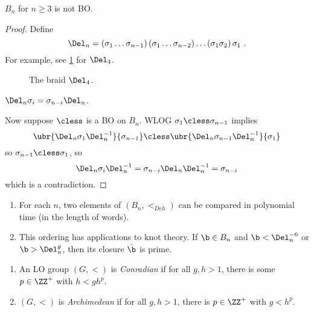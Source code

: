 \begin{prop}
$B_n$ for $n\geq 3$ is not BO.
\end{prop}

\begin{proof}
Define 
\begin{equation*}
\Del_n = \left(\sigma_1 \ldots \sigma_{n-1}\right) \left(\sigma_1 \ldots
\sigma_{n-2}\right) \ldots \left(\sigma_1 \sigma_2\right)\sigma_1
\ .
\end{equation*}
For example, see 
\cref{fig:del} for $\Del_4$.
\begin{figure}
\begin{overlay}
\end{overlay}
\caption{The braid $\Del_4$.}
\label{fig:del}
\end{figure}
\begin{clm}
$\Del_n \sigma_i = \sigma_{n-i} \Del_n$.
\end{clm}
Now suppose $\cless$ is a BO on $B_n$. WLOG $\sigma_1 \cless \sigma_{n-1}$ implies
\begin{equation*}
\ubr{\Del_n \sigma_1 \Del_n^{-1}}{\sigma_{n-1}} \cless \ubr{\Del_n \sigma_{n-1}
\Del_n^{-1}}{\sigma_1}
\end{equation*}
so $\sigma_{n-1} \cless \sigma_1$, so
\begin{equation*}
\Del_n \sigma_i \Del_n^{-1} = \sigma_{n-i} \Del_n \Del_n^{-1} = \sigma_{n-i}
\end{equation*}
which is a contradiction.
\end{proof}

\begin{rmk}
\begin{enumerate}
\item For each $n$, two elements of
$\left(B_n , <_{Deh}\right)$ can be compared in polynomial
time (in the length of words). 
\item This ordering has applications to knot theory. If $\b \in B_n$ and $\b <
\Del_n^{-6}$ or $\b > \Del_n^g$, then its closure $\hat \b$ is prime.
\end{enumerate}
\end{rmk}

\begin{defn}
\begin{enumerate}
\item An LO group $\left(G , <\right)$ is \emph{Conradian} if for all $g,h > 1$, there is some
$p\in \ZZ^+$ with $h < gh^p$.
\item $\left(G , <\right)$ is \emph{Archimedean} if for all $g,h > 1$, there is $p\in
\ZZ^+$ with $g < h^p$.
\end{enumerate}
\end{defn}

